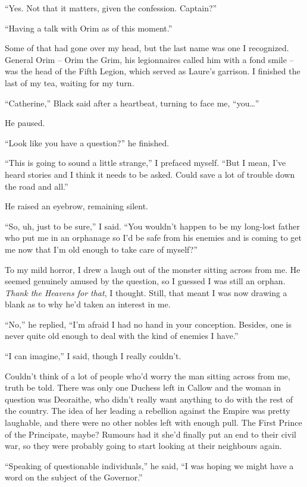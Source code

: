 \documentclass[12pt, openany]{book}
\begin{document}
“Yes. Not that it matters, given the confession. Captain?”

“Having a talk with Orim as of this moment.”

Some of that had gone over my head, but the last name was one I recognized. General Orim – Orim the Grim, his legionnaires called him with a fond smile – was the head of the Fifth Legion, which served as Laure’s garrison. I finished the last of my tea, waiting for my turn.

“Catherine,” Black said after a heartbeat, turning to face me, “you…”

He paused.

“Look like you have a question?” he finished.

“This is going to sound a little strange,” I prefaced myself. “But I mean, I’ve heard stories and I think it needs to be asked. Could save a lot of trouble down the road and all.”

He raised an eyebrow, remaining silent.

“So, uh, just to be sure,” I said. “You wouldn’t happen to be my long-lost father who put me in an orphanage so I’d be safe from his enemies and is coming to get me now that I’m old enough to take care of myself?”

To my mild horror, I drew a laugh out of the monster sitting across from me. He seemed genuinely amused by the question, so I guessed I was still an orphan. \textit{Thank the Heavens for that}, I thought. Still, that meant I was now drawing a blank as to why he’d taken an interest in me.

“No,” he replied, “I’m afraid I had no hand in your conception. Besides, one is never quite old enough to deal with the kind of enemies I have.”

“I can imagine,” I said, though I really couldn’t.

Couldn’t think of a lot of people who’d worry the man sitting across from me, truth be told. There was only one Duchess left in Callow and the woman in question was Deoraithe, who didn’t really want anything to do with the rest of the country. The idea of her leading a rebellion against the Empire was pretty laughable, and there were no other nobles left with enough pull. The First Prince of the Principate, maybe? Rumours had it she’d finally put an end to their civil war, so they were probably going to start looking at their neighbours again.

“Speaking of questionable individuals,” he said, “I was hoping we might have a word on the subject of the Governor.”
\end{document}
